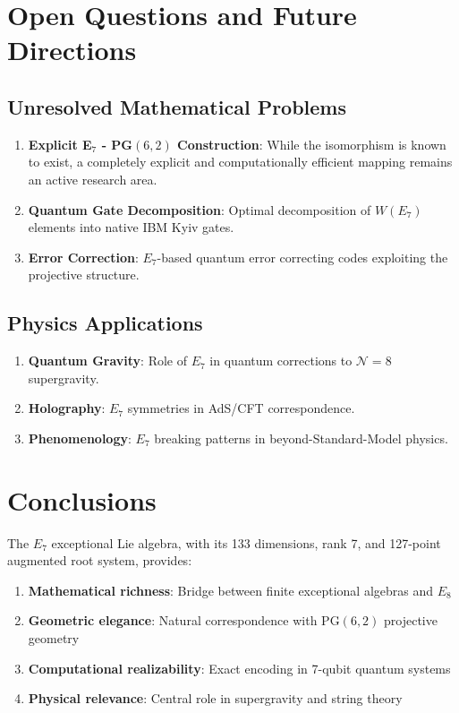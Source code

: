 \section{Open Questions and Future Directions}

\subsection{Unresolved Mathematical Problems}

\begin{enumerate}
    \item \textbf{Explicit E$_7$ - PG$(6,2)$ Construction}: While the isomorphism is known to exist, a completely explicit and computationally efficient mapping remains an active research area.

    \item \textbf{Quantum Gate Decomposition}: Optimal decomposition of $W(E_7)$ elements into native IBM Kyiv gates.

    \item \textbf{Error Correction}: $E_7$-based quantum error correcting codes exploiting the projective structure.
\end{enumerate}

\subsection{Physics Applications}

\begin{enumerate}
    \item \textbf{Quantum Gravity}: Role of $E_7$ in quantum corrections to $\mathcal{N}=8$ supergravity.

    \item \textbf{Holography}: $E_7$ symmetries in AdS/CFT correspondence.

    \item \textbf{Phenomenology}: $E_7$ breaking patterns in beyond-Standard-Model physics.
\end{enumerate}

\section{Conclusions}

The $E_7$ exceptional Lie algebra, with its 133 dimensions, rank 7, and 127-point augmented root system, provides:

\begin{enumerate}
    \item \textbf{Mathematical richness}: Bridge between finite exceptional algebras and $E_8$
    \item \textbf{Geometric elegance}: Natural correspondence with PG$(6,2)$ projective geometry
    \item \textbf{Computational realizability}: Exact encoding in 7-qubit quantum systems
    \item \textbf{Physical relevance}: Central role in supergravity and string theory
\end{enumerate}

